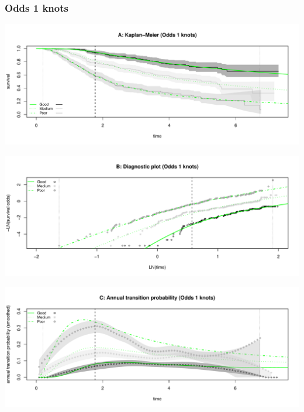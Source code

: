 \documentclass[
]{article}
\begin{document}
\clearpage

\subsubsection{Odds 1 knots}\label{odds-1-knots}

\begin{flushleft}\includegraphics[height=0.25\textheight]{BC_OS_output/Images/Figure_spline_models-10} \end{flushleft}

\begin{flushleft}\includegraphics[height=0.25\textheight]{BC_OS_output/Images/Figure_spline_models-11} \end{flushleft}

\begin{flushleft}\includegraphics[height=0.25\textheight]{BC_OS_output/Images/Figure_spline_models-12} \end{flushleft}
\end{document}
